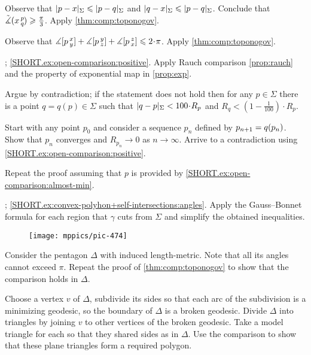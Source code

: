 \setcounter{eqtn}{0}

Observe that $\dist{p}{x}\Sigma\le \dist{p}{q}\Sigma$ and $\dist{q}{x}\Sigma\le \dist{p}{q}\Sigma$.
Conclude that $\tilde\measuredangle(x\,{}^{p}_{q}\hspace{-0.2ex})\geqslant \tfrac\pi3$.
Apply \ref{thm:comp:toponogov}.

Observe that 
$\measuredangle\hinge pxy+\measuredangle\hinge pyz+\measuredangle\hinge pzx\le2\cdot \pi$.
Apply \ref{thm:comp:toponogov}.

\parbf{\ref{ex:open-comparison}}; \ref{SHORT.ex:open-comparison:positive}. Apply Rauch comparison \ref{prop:rauch} and the property of exponential map in \ref{prop:exp}.

 Argue by contradiction;
if the statement does not hold then for any $p\in\Sigma$ there is a point $q=q(p)\in \Sigma$ such that 
$\dist{q}{p}\Sigma< 100\cdot R_p$
and
$R_q<(1-\tfrac1{100})\cdot R_p$.

Start with any point $p_0$ and consider a sequence $p_n$ defined by $p_{n+1}\z=q(p_n)$.
Show that $p_n$ converges and $R_{p_n}\to 0$ as $n\to\infty$.
Arrive to a contradiction using  \ref{SHORT.ex:open-comparison:positive}.

 Repeat the proof assuming that $p$ is provided by \ref{SHORT.ex:open-comparison:almost-min}.

\parbf{\ref{ex:convex-polyhon+self-intersections}}; \ref{SHORT.ex:convex-polyhon+self-intersections:angles}.
Apply the Gauss--Bonnet formula for each region that $\gamma$ cuts from $\Sigma$ and simplify the obtained inequalities.

\begin{wrapfigure}[9]{r}{50 mm}
\vskip-0mm
\centering
\texttt{[image: mppics/pic-474]}
\vskip8mm
\end{wrapfigure}

Consider the pentagon $\Delta$ with induced length-metric.
Note that all its angles cannot exceed $\pi$.
Repeat the proof of \ref{thm:comp:toponogov} to show that the comparison holds in $\Delta$.

Choose a vertex $v$ of $\Delta$, subdivide its sides so that each arc of the subdivision is a minimizing geodesic, so the boundary of $\Delta$ is a broken geodesic.
Divide $\Delta$ into triangles by joining $v$ to other vertices of the broken geodesic.
Take a model triangle for each so that they shared sides as in $\Delta$.
Use the comparison to show that these plane triangles form a required polygon.

